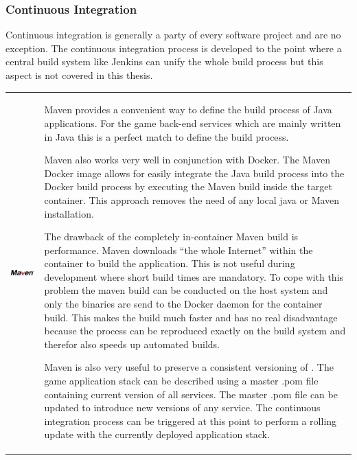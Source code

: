 \subsubsection{Continuous Integration}

Continuous integration is generally a party of every software project and \og{}
are no exception. The continuous integration process is developed to the point
where a central build system like Jenkins can unify the whole build process
but this aspect is not covered in this thesis.


\begin{table}[h!]
  \centering
  \begin{tabular}{ c m{9cm} }
    \begin{minipage}{.3\textwidth}
      \includegraphics[width=\linewidth]{images/dependencies/maven}
    \end{minipage}&
	Maven provides a convenient way to define the build process of Java
	applications. For the game back-end services which are mainly written in Java
	this is a perfect match to define the build process.
	
	Maven also works very well in conjunction with Docker. The Maven Docker image
	allows for easily integrate the Java build process into the Docker build
	process by executing the Maven build inside the target container. This approach
	removes the need of any local java or Maven installation. 
	
	The drawback of the completely in-container Maven build is performance. Maven
	downloads ``the whole Internet'' within the container to build the application.
	This is not useful during development where short build times are mandatory. To
	cope with this problem the maven build can be conducted on the host system and
	only the binaries are send to the Docker daemon for the container build. This
	makes the build much faster and has no real disadvantage because the process
	can be reproduced exactly on the build system and therefor also speeds up
	automated builds.
	
	Maven is also very useful to preserve a consistent versioning of \mss{}. The
	game application stack can be described using a master .pom file containing
	current version of all services. The master .pom file can be updated to
	introduce new versions of any service. The continuous integration process can
	be triggered at this point to perform a rolling update with the currently
	deployed application stack.
	
  \end{tabular}
\end{table}

